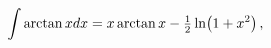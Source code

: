 \[\int\mathop{\mathrm{arctan}\/}\nolimits xdx=x\mathop{\mathrm{arctan}\/}%
\nolimits x-\tfrac{1}{2}\mathop{\ln\/}\nolimits\!\left(1+x^{2}\right),\]
